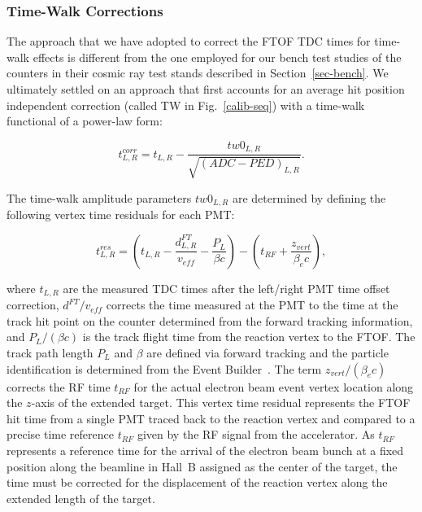 \documentclass[final,3p,twocolumn]{elsarticle}
\begin{document}
\subsubsection{Time-Walk Corrections}
\label{sec-tw}

The approach that we have adopted to correct the FTOF TDC times for time-walk effects is different from
the one employed for our bench test studies of the counters in their cosmic ray test stands described in
Section~\ref{sec-bench}. We ultimately settled on an approach that first accounts for an average hit
position independent correction (called TW in Fig.~\ref{calib-seq}) with a time-walk functional of a
power-law form:

\begin{equation}
\label{tw-func}
t^{corr}_{L,R} = t_{L,R} - \frac{tw0_{L,R}}{\sqrt{(ADC - PED)_{L,R}}}.
\end{equation}

The time-walk amplitude parameters $tw0_{L,R}$ are determined by defining the following vertex time
residuals for each PMT:

\begin{equation}
\label{tres}
t_{L,R}^{res} = \left(t_{L,R} - \frac{d_{L,R}^{FT}}{v_{eff}} - \frac{P_L}{\beta c} \right) 
- \left( t_{RF} + \frac{z_{vert}}{\beta_e c} \right),
\end{equation}

\noindent
where $t_{L,R}$ are the measured TDC times after the left/right PMT time offset correction, $d^{FT}/v_{eff}$
corrects the time measured at the PMT to the time at the track hit point on the counter determined from the
forward tracking information, and $P_L/(\beta c)$ is the track flight time from the reaction vertex to the
FTOF. The track path length $P_L$ and $\beta$ are defined via forward tracking and the particle identification
is determined from the Event Builder~\cite{daq-nim}. The term $z_{vert}/(\beta_e c)$ corrects the RF time
$t_{RF}$ for the actual electron beam event vertex location along the $z$-axis of the extended target. This
vertex time residual represents the FTOF hit time from a single PMT traced back to the reaction vertex and
compared to a precise time reference $t_{RF}$ given by the RF signal from the accelerator. As $t_{RF}$
represents a reference time for the arrival of the electron beam bunch at a fixed position along the beamline in
Hall~B assigned as the center of the target, the time must be corrected for the displacement of the reaction
vertex along the extended length of the target.
\end{document}
